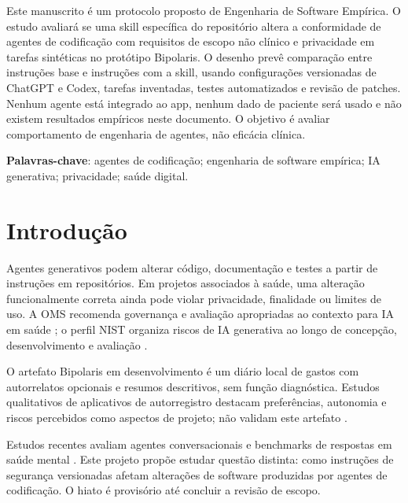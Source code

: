 \documentclass[article,12pt,oneside,a4paper,brazil]{abntex2}
\begin{document}
\maketitle

\begin{resumo}
Este manuscrito é um protocolo proposto de Engenharia de Software Empírica. O estudo avaliará se uma skill específica do repositório altera a conformidade de agentes de codificação com requisitos de escopo não clínico e privacidade em tarefas sintéticas no protótipo Bipolaris. O desenho prevê comparação entre instruções base e instruções com a skill, usando configurações versionadas de ChatGPT e Codex, tarefas inventadas, testes automatizados e revisão de patches. Nenhum agente está integrado ao app, nenhum dado de paciente será usado e não existem resultados empíricos neste documento. O objetivo é avaliar comportamento de engenharia de agentes, não eficácia clínica.
\end{resumo}

\textbf{Palavras-chave}: agentes de codificação; engenharia de software empírica; IA generativa; privacidade; saúde digital.

\textual
\section{Introdução}
Agentes generativos podem alterar código, documentação e testes a partir de instruções em repositórios. Em projetos associados à saúde, uma alteração funcionalmente correta ainda pode violar privacidade, finalidade ou limites de uso. A OMS recomenda governança e avaliação apropriadas ao contexto para IA em saúde \cite{who2024ethics}; o perfil NIST organiza riscos de IA generativa ao longo de concepção, desenvolvimento e avaliação \cite{nist2024genai}.

O artefato Bipolaris em desenvolvimento é um diário local de gastos com autorrelatos opcionais e resumos descritivos, sem função diagnóstica. Estudos qualitativos de aplicativos de autorregistro destacam preferências, autonomia e riscos percebidos como aspectos de projeto; não validam este artefato \cite{astillwright2025coproduction,michalak2025selfmonitoring}.

Estudos recentes avaliam agentes conversacionais e benchmarks de respostas em saúde mental \cite{feng2025agents,badawi2026mentalbench}. Este projeto propõe estudar questão distinta: como instruções de segurança versionadas afetam alterações de software produzidas por agentes de codificação. O hiato é provisório até concluir a revisão de escopo.
\end{document}
